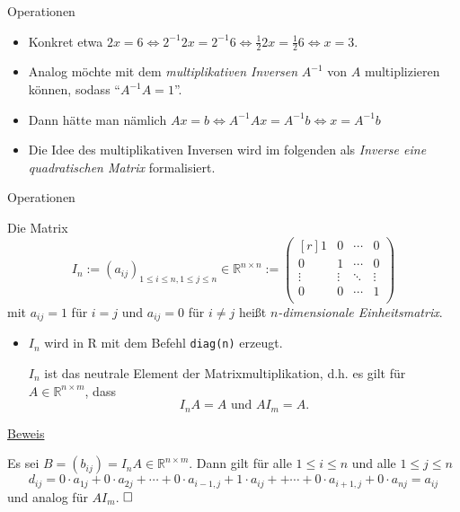 \documentclass[
  8pt,
  ignorenonframetext,
]{beamer}
\providecommand{\tightlist}{%
  \setlength{\itemsep}{0pt}\setlength{\parskip}{0pt}}
\begin{document}
\begin{frame}{Operationen}
\begin{itemize}
\item
  Konkret etwa
  \(2x = 6 \Leftrightarrow 2^{-1} 2x = 2^{-1}6 \Leftrightarrow \frac{1}{2}2x = \frac{1}{2}6 \Leftrightarrow x = 3\).
\item
  Analog möchte mit dem \emph{multiplikativen Inversen} \(A^{-1}\) von
  \(A\) multiplizieren können, sodass ``\(A^{-1}A = 1\)''.
\item
  Dann hätte man nämlich
  \(Ax = b \Leftrightarrow A^{-1}Ax = A^{-1}b \Leftrightarrow x = A^{-1}b\)
\item
  Die Idee des multiplikativen Inversen wird im folgenden als
  \emph{Inverse eine quadratischen Matrix} formalisiert.
\end{itemize}
\end{frame}

\begin{frame}[fragile]{Operationen}
\protect\hypertarget{operationen-23}{}
\footnotesize
{}
\begin{definition}[Einheitsmatrix]
Die Matrix
\begin{equation}
I_n
:= (a_{ij})_{1\le i \le n, 1 \le j \le n}  \in \mathbb{R}^{n \times n}
:=
\begin{pmatrix*}[r]
1      & 0      & \cdots & 0       \\
0      & 1      & \cdots & 0       \\
\vdots & \vdots & \ddots & \vdots  \\
0      & 0      & \cdots & 1       \\
\end{pmatrix*}
\end{equation}
mit $a_{ij} = 1$ für $i = j$  und  $a_{ij} = 0$ für  $i \neq j$ heißt
\textit{$n$-dimensionale Einheitsmatrix}.
\end{definition}

\begin{itemize}
\tightlist
\item
  \(I_n\) wird in R mit dem Befehl \texttt{diag(n)} erzeugt.

  \begin{theorem}
  \justifying
  \normalfont
  $I_n$ ist das neutrale Element der Matrixmultiplikation, d.h. es gilt für $A \in \mathbb{R}^{n \times m}$,
  dass
  \begin{equation}
  I_nA = A \mbox{ und } AI_m = A.
  \end{equation}
  \end{theorem}
\end{itemize}

\underline{Beweis}

Es sei \(B = (b_{ij}) = I_nA \in \mathbb{R}^{n\times m}\). Dann gilt für
alle \(1 \le i \le n\) und alle \(1 \le j \le n\) \begin{equation}
d_{ij}
= 0 \cdot a_{1j}
+ 0 \cdot a_{2j}
+ \cdots
+ 0 \cdot a_{i-1,j}
+ 1 \cdot a_{ij} +
+ \cdots
+ 0 \cdot a_{i+1,j}
+ 0 \cdot a_{nj}
= a_{ij}
\end{equation} und analog für \(AI_m\). \(\hfill \Box\)
\end{frame}
\end{document}
